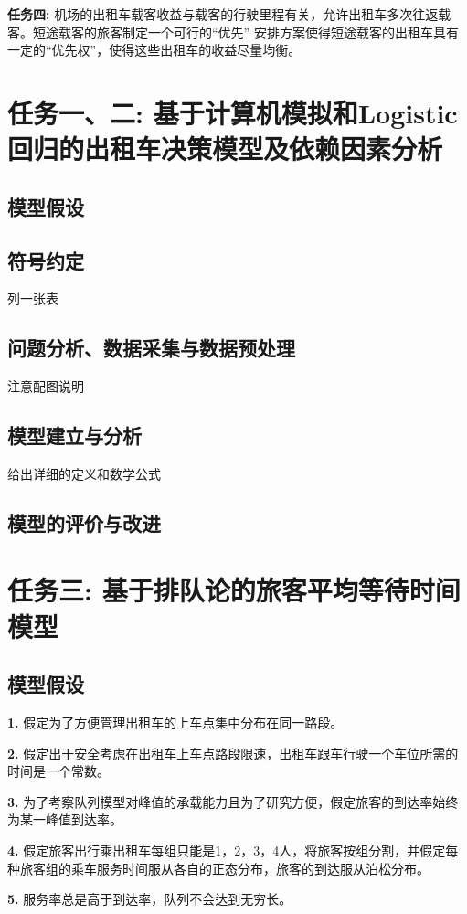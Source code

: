 \documentclass[UTF8]{ctexart}
\begin{document}
	\textbf{任务四:} 机场的出租车载客收益与载客的行驶里程有关，允许出租车多次往返载客。短途载客的旅客制定一个可行的“优先” 安排方案使得短途载客的出租车具有一定的“优先权”，使得这些出租车的收益尽量均衡。
	\section{任务一、二: 基于计算机模拟和Logistic\\回归的出租车决策模型及依赖因素分析}
	\subsection{模型假设}
	\subsection{符号约定}
	列一张表
	\subsection{问题分析、数据采集与数据预处理}
	注意配图说明
	\subsection{模型建立与分析}
	给出详细的定义和数学公式
	\subsection{模型的评价与改进}
	
	\section{任务三: 基于排队论的旅客平均等待时间模型}
	\subsection{模型假设}
	\textbf{1.} 假定为了方便管理出租车的上车点集中分布在同一路段。
	
	\textbf{2.} 假定出于安全考虑在出租车上车点路段限速，出租车跟车行驶一个车位所需的时间是一个常数。
	
	\textbf{3. }为了考察队列模型对峰值的承载能力且为了研究方便，假定旅客的到达率始终为某一峰值到达率。
	
    \textbf{4.} 假定旅客出行乘出租车每组只能是1，2，3，4人，将旅客按组分割，并假定每种旅客组的乘车服务时间服从各自的正态分布，旅客的到达服从泊松分布。
    
    \textbf{5. }服务率总是高于到达率，队列不会达到无穷长。
\end{document}
